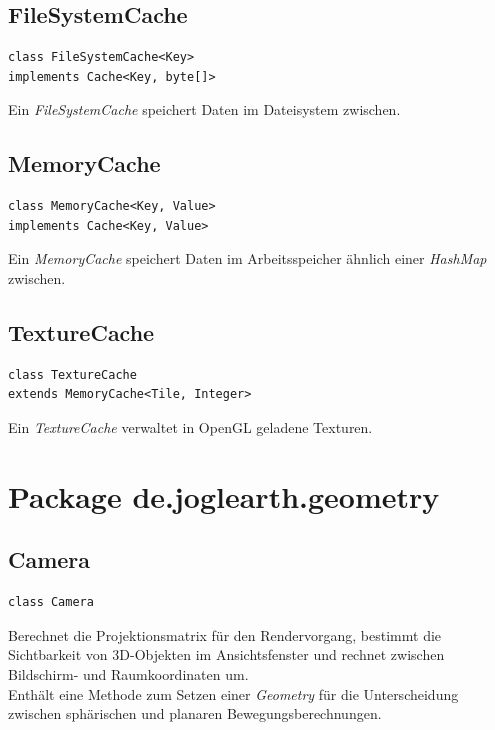\documentclass[10pt]{scrreprt}
\begin{document}
\vspace{5mm}
\subsection*{FileSystemCache}
\begin{lstlisting}
class FileSystemCache<Key>
implements Cache<Key, byte[]>
\end{lstlisting}
Ein \textit{FileSystemCache} speichert Daten im Dateisystem zwischen.\\

\vspace{5mm}
\subsection*{MemoryCache}
\begin{lstlisting}
class MemoryCache<Key, Value>
implements Cache<Key, Value>
\end{lstlisting}
Ein \textit{MemoryCache} speichert Daten im Arbeitsspeicher ähnlich einer \textit{HashMap} zwischen.\\

\newpage
\vspace{5mm}
\subsection*{TextureCache}
\begin{lstlisting}
class TextureCache
extends MemoryCache<Tile, Integer>
\end{lstlisting}
Ein \textit{TextureCache} verwaltet in OpenGL geladene Texturen.


\vspace{5mm}
\section{Package de.joglearth.geometry}
\subsection*{Camera}
\begin{lstlisting}
class Camera
\end{lstlisting}
Berechnet die Projektionsmatrix für den Rendervorgang, bestimmt die Sichtbarkeit von 3D-Objekten im Ansichtsfenster und rechnet zwischen Bildschirm- und Raumkoordinaten um.\\
Enthält eine Methode zum Setzen einer \textit{Geometry} für die Unterscheidung zwischen sphärischen und planaren Bewegungsberechnungen.\\
\end{document}
